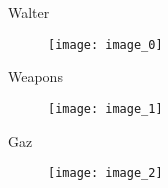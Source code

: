 \begin{frame}{Walter}
	\begin{figure}[h!]
	\centering
	\texttt{[image: image\_0]}
\end{figure}
\end{frame}

\begin{frame}{Weapons}
	\begin{figure}[h!]
	\centering
	\texttt{[image: image\_1]}
\end{figure}
\end{frame}

\begin{frame}{Gaz}
	\begin{figure}[h!]
	\centering
	\texttt{[image: image\_2]}
\end{figure}
\end{frame}

